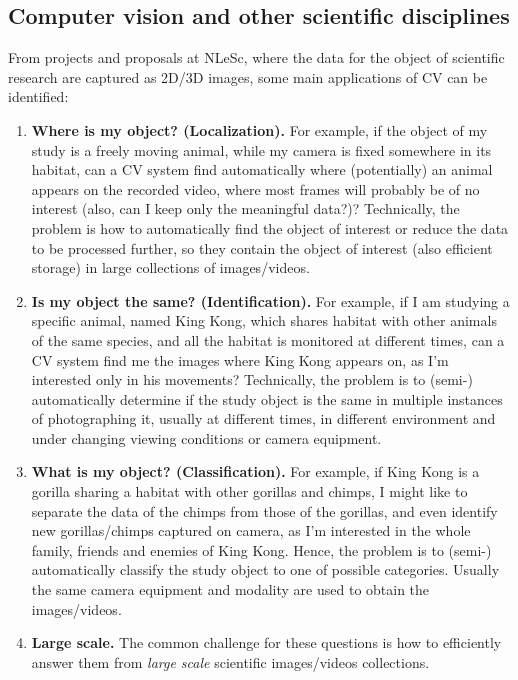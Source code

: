 \subsection{Computer vision and other scientific disciplines}
From projects and proposals at NLeSc, where the data for the object of scientific research are captured as 2D/3D images, some main applications of CV can be identified:
\begin{enumerate}
\item {\bf Where is my object? (Localization).} For example, if the object of my study is a freely moving animal, while my camera is fixed somewhere in its habitat, can a CV system find automatically where (potentially) an animal appears on the recorded video, where most frames will probably be of no interest (also, can I keep only the meaningful data?)? Technically, the problem is how to automatically find the object of interest or reduce the data to be processed further, so they contain the object of interest (also efficient storage) in large collections of images/videos.
\item {\bf Is my object the same? (Identification).} For example, if I am studying a specific animal, named King Kong, which shares habitat with other animals of the same species, and all the habitat is monitored at different times, can a CV system find me the images where King Kong appears on, as I'm interested only in his movements? Technically, the problem is to (semi-) automatically determine if the study object is the same in multiple instances of photographing it, usually at different times, in different environment and under changing viewing conditions or camera equipment.
\item {\bf What is my object? (Classification).} For example, if King Kong is a gorilla sharing a habitat with other gorillas and chimps, I might like to separate the data of the chimps from those of the gorillas, and even identify new gorillas/chimps captured on camera, as I'm interested in the whole family, friends and enemies of King Kong. Hence, the problem is to (semi-) automatically classify the study object to one of possible categories. Usually the same camera equipment and modality are used to obtain the images/videos.
\item{\bf Large scale.} The common challenge for these questions is how to efficiently answer them from {\em large scale} scientific images/videos collections.
\end{enumerate}

